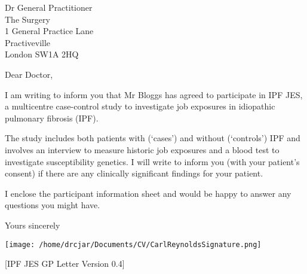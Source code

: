 \documentclass[imperial,letterpaper,pagesize,UScommercial9]{scrlttr2}
\begin{document}
\begin{letter}{Dr General Practitioner \\ The Surgery \\ 1 General Practice Lane \\ Practiveville \\ London SW1A 2HQ}


\opening{Dear Doctor,}

    I am writing to inform you that Mr Bloggs has agreed to participate in IPF JES, a multicentre case-control study to investigate job exposures in idiopathic pulmonary fibrosis (IPF).
    
    The study includes both patients with (`cases') and without (`controls') IPF and involves an interview to measure historic job exposures and a blood test to investigate susceptibility genetics. I will write to inform you (with your patient's consent) if there are any clinically significant findings for your patient. 
    
    I enclose the participant information sheet and would be happy to answer any questions you might have.




\closing{Yours sincerely}

    \texttt{[image: /home/drcjar/Documents/CV/CarlReynoldsSignature.png]}

    \vfill \hfill [IPF JES GP Letter Version 0.4]

\end{letter}
\end{document}

